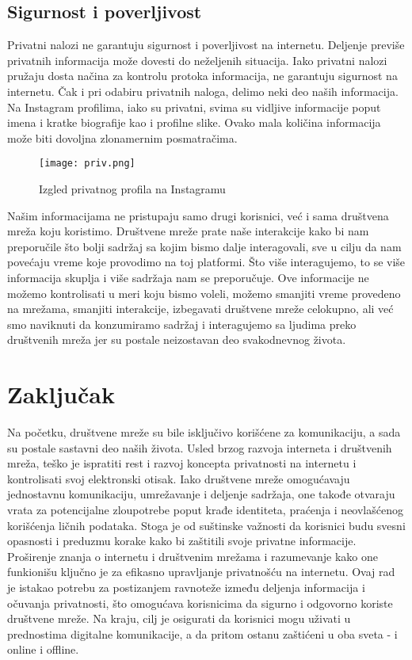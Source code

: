 \documentclass[12pt, a4paper]{article}
\begin{document}
{\subsection{Sigurnost i poverljivost}

Privatni nalozi ne garantuju sigurnost i poverljivost na internetu. Deljenje previše privatnih informacija može dovesti do neželjenih situacija. Iako privatni nalozi pružaju dosta načina za kontrolu protoka informacija, ne garantuju sigurnost na internetu. Čak i pri odabiru privatnih naloga, delimo neki deo naših informacija.
Na Instagram profilima, iako su privatni, svima su vidljive informacije poput imena i kratke biografije kao i profilne slike. Ovako mala količina informacija može biti dovoljna zlonamernim posmatračima.


\begin{figure}[h!]
     \centering
     \texttt{[image: priv.png]}
     \label{fig:privatni profil}
     \caption{Izgled privatnog profila na Instagramu}
 \end{figure}

Našim informacijama ne pristupaju samo drugi korisnici, već i sama društvena mreža koju koristimo. Društvene mreže prate naše interakcije kako bi nam preporučile što bolji sadržaj sa kojim bismo dalje interagovali, sve u cilju da nam povećaju vreme koje provodimo na toj platformi. Što više interagujemo, to se više informacija skuplja i više sadržaja nam se preporučuje. 
Ove informacije ne možemo kontrolisati u meri koju bismo voleli, možemo smanjiti vreme provedeno na mrežama, smanjiti interakcije, izbegavati društvene mreže celokupno, ali već smo naviknuti da konzumiramo sadržaj i interagujemo sa ljudima preko društvenih mreža jer su postale neizostavan deo svakodnevnog života.



\section{Zaključak}
\label{sec:zakljucak}

Na početku, društvene mreže su bile isključivo korišćene za komunikaciju, a sada su postale sastavni deo naših života. Usled brzog razvoja interneta i društvenih mreža, teško je ispratiti rest i razvoj koncepta privatnosti na internetu i kontrolisati svoj elektronski otisak. Iako društvene mreže omogućavaju jednostavnu komunikaciju, umrežavanje i deljenje sadržaja, one takođe otvaraju vrata za potencijalne zloupotrebe poput krađe identiteta, praćenja i neovlašćenog korišćenja ličnih podataka. Stoga je od suštinske važnosti da korisnici budu svesni opasnosti i preduzmu korake kako bi zaštitili svoje privatne informacije. Proširenje znanja o internetu i društvenim mrežama i razumevanje kako one funkionišu ključno je za efikasno upravljanje privatnošću na internetu.
Ovaj rad je istakao potrebu za postizanjem ravnoteže između deljenja informacija i očuvanja privatnosti, što omogućava korisnicima da sigurno i odgovorno koriste društvene mreže. Na kraju, cilj je osigurati da korisnici mogu uživati u prednostima digitalne komunikacije, a da pritom ostanu zaštićeni u oba sveta - i online i offline.

}
\end{document}

